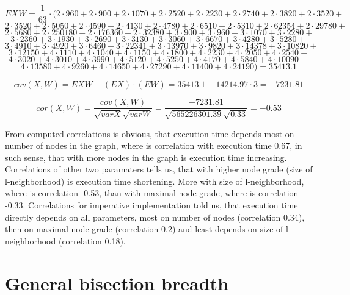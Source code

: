 \documentclass[11pt,twoside,a4paper]{book}
\begin{document}

$$EXW= \frac{1}{63}\cdot(2\cdot 960  + 2\cdot  900  + 2\cdot  1070 +
2 \cdot  2520+ 2 \cdot   2230+ 2 \cdot  2740  +2 \cdot   3820 +2\cdot  
 3520+$$ $$2 \cdot  3520 +2\cdot 
5050 +2\cdot  4590 +2\cdot 4130 +2\cdot  4780
+2\cdot   6510 +2\cdot 5310+2\cdot  62354
 +2\cdot  29780 +$$ $$2\cdot   5680  +2\cdot  250180
+2\cdot   176360 +2\cdot 32380 +3\cdot 900
 +3\cdot 960 +3\cdot  1070 + 3 \cdot 2280+$$
 $$3\cdot   2360  +3\cdot  1930
+3\cdot   2690 +3\cdot  3130 +3\cdot 3060
 +3\cdot 6670 +3\cdot  4280 + 3 \cdot  5280+$$
 $$3\cdot  4910  +3\cdot 4920
+3\cdot 6460 +3\cdot  22341 +3\cdot 13970
 +3\cdot  9820 +3\cdot  14378 + 3 \cdot  10820+$$
 $$3\cdot  12150  +4\cdot 1110
+4\cdot  1040 +4\cdot  1150 +4\cdot 1800
 +4\cdot 2230 +4\cdot   2050 + 4 \cdot  2540+$$
 $$4\cdot   3020  +4\cdot  3010
+4\cdot  3990 +4\cdot   5120 +4\cdot  5250
 +4\cdot 4170 +4\cdot   5840 + 4 \cdot  10090+$$
$$4\cdot  13580  +4\cdot  9260
+4\cdot 14650  +4\cdot 27290 +4\cdot  11400
 +4\cdot   24190)=35413.1$$

$$cov\left(X,W\right)=EXW-\left(EX\right)\cdot \left(EW\right)=35413.1
-14214.97\cdot 3=-7231.81$$

$$cor(X,W)=\frac{cov(X,W)}{\sqrt{varX}\sqrt{varW}}=\frac{-7231.81}{\sqrt{565226301.39}\sqrt{0.33}}=-0.53$$

From computed correlations is obvious, that execution time depends most on
number of nodes in the graph, where is correlation with execution time 0.67, in
such sense, that with more nodes in the graph is execution time increasing.
Correlations of other two paramaters tells us, that with higher node grade
(size of l-neighborhood) is execution time shortening. More with size of
l-neighborhood, where is correlation -0.53, than with maximal node grade, where
is correlation -0.33. Correlations for imperative implementation told us, that
execution time directly depends on all parameters, most on number of nodes
(correlation 0.34), then on maximal node grade (correlation 0.2) and least
depends on size of l-neighborhood (correlation 0.18).


\newpage
\section{General bisection breadth}
\end{document}
